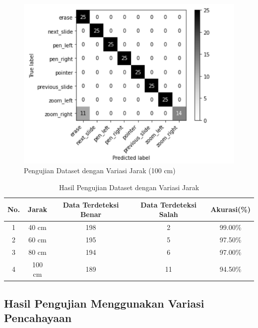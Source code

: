 \hfill \break
\hfill \break
\hfill \break
\hfill \break

\begin{figure}[!htb]
  \centering
  \includegraphics[scale=0.8]{gambar/pengujian-jarak/heterogen-dataset/100cm.png}
  \caption{Pengujian Dataset dengan Variasi Jarak (100 cm)}
  \label{fig:Pengujian Dataset dengan Variasi Jarak (100 cm)}
\end{figure}

\begin{longtable}{|c|c|c|c|c|}
  \caption{Hasil Pengujian Dataset dengan Variasi Jarak}
  \label{tb:Hasil Pengujian Dataset dengan Variasi Jarak}\\
  \hline
  \rowcolor[HTML]{FFFFFF}
  \textbf{No.} & \textbf{Jarak} & \textbf{Data Terdeteksi Benar} & \textbf{Data Terdeteksi Salah} & \textbf{Akurasi(\%)} \\
  \hline
  1 & 40 cm  & 198 & 2 & 99.00\%  \\
  2 & 60 cm  & 195 & 5 & 97.50\%  \\
  3 & 80 cm  & 194 & 6 & 97.00\%  \\
  4 & 100 cm & 189 & 11 & 94.50\%  \\
  \hline
\end{longtable}

\subsection{Hasil Pengujian Menggunakan Variasi Pencahayaan}
\label{subsec:Hasil Pengujian Menggunakan Variasi Pencahayaan}

